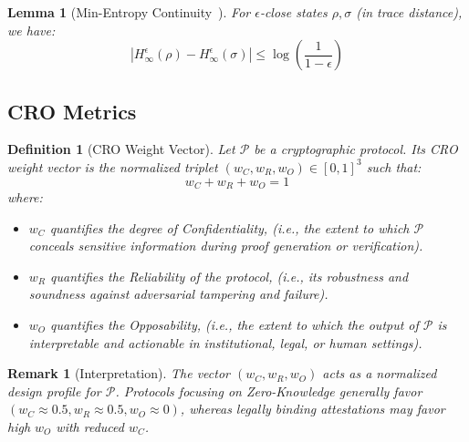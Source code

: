 \documentclass[preprint,12pt]{elsarticle}
\newtheorem{definition}{Definition}[section]
\newtheorem{lemma}{Lemma}[section]
\newtheorem{remark}{Remark}[section]
\begin{document}
            \begin{lemma}[Min-Entropy Continuity~{\cite[Theorem 3.3.3]{Renner2005}}]\label{lem:min_entropy_continuity}
                For $\epsilon$-close states $\rho, \sigma$ (in trace distance), we have:
                \[
                |H_\infty^\epsilon(\rho) - H_\infty^\epsilon(\sigma)| \leq \log \left( \frac{1}{1 - \epsilon} \right)
                \]
            \end{lemma}

        \subsection{CRO Metrics}
            \label{subsec:cro_vector}
                \begin{definition}[CRO Weight Vector]\label{def:cro_weights}
                    Let $\mathcal{P}$ be a cryptographic protocol. Its \emph{CRO weight vector} is the normalized triplet $(w_C, w_R, w_O) \in [0,1]^3$ such that:
                    \begin{equation}\label{eq:cro_weights}
                        w_C + w_R + w_O = 1
                    \end{equation}
                    where:
                    \begin{itemize}
                        \item $w_C$ quantifies the degree of \emph{Confidentiality}, (i.e., the extent to which $\mathcal{P}$ conceals sensitive information during proof generation or verification).
                        \item $w_R$ quantifies the \emph{Reliability} of the protocol, (i.e., its robustness and soundness against adversarial tampering and failure).
                        \item $w_O$ quantifies the \emph{Opposability}, (i.e., the extent to which the output of $\mathcal{P}$ is interpretable and actionable in institutional, legal, or human settings).
                    \end{itemize}
                    \end{definition}

                    \begin{remark}[Interpretation]\label{rem:cro_weight_interpretation}
                        The vector $(w_C, w_R, w_O)$ acts as a normalized design profile for $\mathcal{P}$. Protocols focusing on Zero-Knowledge generally favor $(w_C \approx 0.5, w_R \approx 0.5, w_O \approx 0)$, whereas legally binding attestations may favor high $w_O$ with reduced $w_C$.
                    \end{remark}
            
\end{document}
